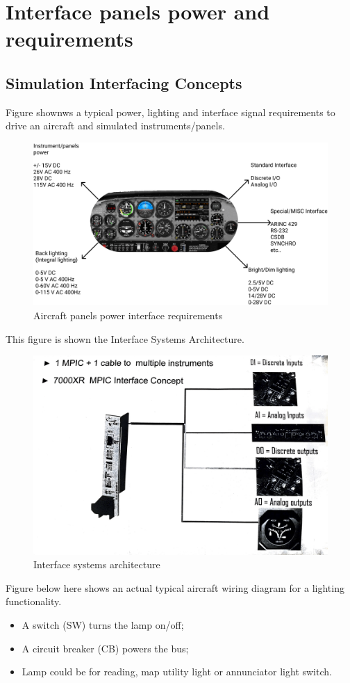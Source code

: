 \section{Interface panels power and requirements}
    \subsection{Simulation Interfacing Concepts}
        Figure shownws a typical power, lighting and interface signal requirements to drive an aircraft and simulated instruments/panels.
        \begin{figure}[H]
            \centering
            \includegraphics[width=0.6\linewidth]{img/Simulation.png}
            \caption{Aircraft panels power interface requirements}
        \end{figure}
        This figure is shown the Interface Systems Architecture.
        \begin{figure}[H]
            \centering
            \includegraphics[width=0.6\linewidth]{img/image.png}
            \caption{Interface systems architecture}
        \end{figure}
        Figure below here shows an actual typical aircraft wiring diagram for a lighting functionality.
        \begin{itemize}
            \item A switch (SW) turns the lamp on/off;
            \item A circuit breaker (CB) powers the bus;
            \item Lamp could be for reading, map utility light or annunciator light switch.
        \end{itemize}
